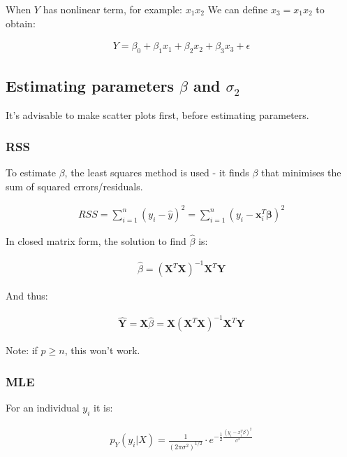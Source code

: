 \documentclass{article}
\begin{document}
When $Y$ has nonlinear term, for example: $x_1x_2$
We can define $x_3=x_1x_2$ to obtain:

\begin{align*}
    Y=\beta_0+\beta_1x_1+\beta_2x_2+\beta_3x_3+\epsilon
\end{align*}


\subsection{Estimating parameters $\beta$ and $\sigma_2$}

It's advisable to make scatter plots first, before estimating parameters.

\subsubsection{RSS}

To estimate $\beta$, the least squares method is used - it finds $\beta$ that minimises the sum of squared errors/residuals.

\begin{align*}
    RSS = \sum_{i=1}^n (y_i-\hat{y})^2=\sum_{i=1}^n(y_i-\boldsymbol{x}_i^T\boldsymbol{\beta})^2
\end{align*}

In closed matrix form, the solution to find $\hat{\beta}$ is:

\begin{align*}
    \hat{\beta}=(\boldsymbol{X}^T\boldsymbol{X})^{-1}\boldsymbol{X}^T\boldsymbol{Y}
\end{align*}

And thus:

\begin{align*}
    \hat{\boldsymbol{Y}}=\boldsymbol{X}\hat{\beta}=\boldsymbol{X}(\boldsymbol{X}^T\boldsymbol{X})^{-1}\boldsymbol{X}^T\boldsymbol{Y}
\end{align*}

Note: if $p\geq n$, this won't work.

\subsubsection{MLE}

For an individual $y_i$ it is:

\begin{align*}
    p_Y(y_i|X)=\frac{1}{(2\pi\sigma^2)^{1/2}}
    \cdot
    e^{-\frac{1}{2}\frac{(y_i-x_i^T\beta)^2}{\sigma^2}}
\end{align*}
\end{document}
